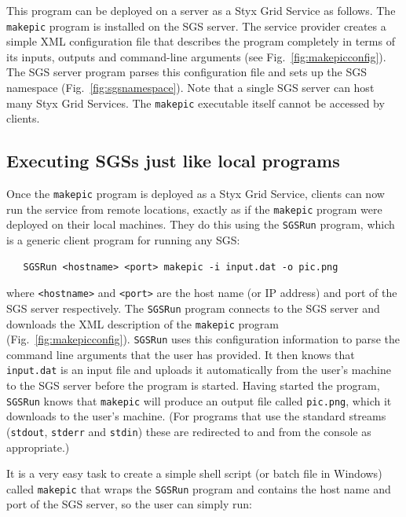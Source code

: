 \documentclass[a4paper]{article}
\begin{document}
This program can be deployed on a server as a Styx Grid Service as follows.  The \texttt{makepic} program is installed on the SGS server.  The service provider creates a simple XML configuration file that describes the program completely in terms of its inputs, outputs and command-line arguments (see Fig.~\ref{fig:makepicconfig}).  The SGS server program parses this configuration file and sets up the SGS namespace (Fig.~\ref{fig:sgsnamespace}).  Note that a single SGS server can host many Styx Grid Services.  The \texttt{makepic} executable itself cannot be accessed by clients.

\subsection{Executing SGSs just like local programs}

Once the \texttt{makepic} program is deployed as a Styx Grid Service, clients can now run the service from remote locations, exactly as if the \texttt{makepic} program were deployed on their local machines.  They do this using the \texttt{SGSRun} program, which is a generic client program for running any SGS:

\begin{verbatim}
   SGSRun <hostname> <port> makepic -i input.dat -o pic.png
\end{verbatim}
where \texttt{<hostname>} and \texttt{<port>} are the host name (or IP address) and port of the SGS server respectively.  The \texttt{SGSRun} program connects to the SGS server and downloads the XML description of the \texttt{makepic} program  (Fig.~\ref{fig:makepicconfig}).  \texttt{SGSRun} uses this configuration information to parse the command line arguments that the user has provided.  It then knows that \texttt{input.dat} is an input file and uploads it automatically from the user's machine to the SGS server before the program is started.  Having started the program, \texttt{SGSRun} knows that \texttt{makepic} will produce an output file called \texttt{pic.png}, which it downloads to the user's machine.  (For programs that use the standard streams (\texttt{stdout}, \texttt{stderr} and \texttt{stdin}) these are redirected to and from the console as appropriate.)

It is a very easy task to create a simple shell script (or batch file in Windows) called \texttt{makepic} that wraps the \texttt{SGSRun} program and contains the host name and port of the SGS server, so the user can simply run:
\end{document}
